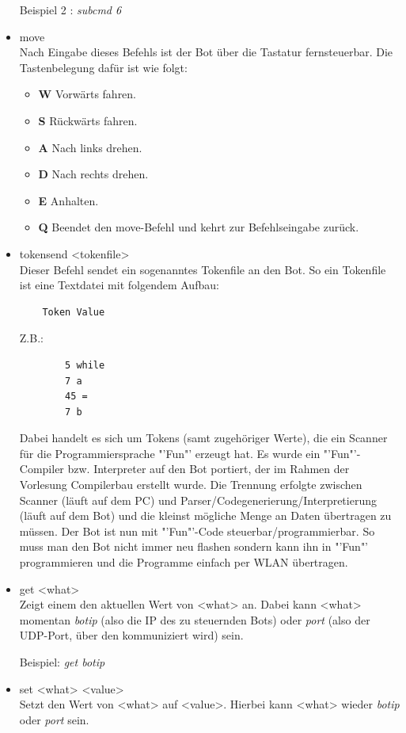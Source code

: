 \begin{itemize}
    Beispiel 2 : \textit{subcmd 6}
    \item move\\
    Nach Eingabe dieses Befehls ist der Bot über die Tastatur fernsteuerbar. Die Tastenbelegung dafür ist wie folgt:
    \begin{itemize}
        \item \textbf{W} Vorwärts fahren.
        \item \textbf{S} Rückwärts fahren.
        \item \textbf{A} Nach links drehen.
        \item \textbf{D} Nach rechts drehen.
        \item \textbf{E} Anhalten.
        \item \textbf{Q} Beendet den move-Befehl und kehrt zur Befehlseingabe zurück.
    \end{itemize}
    \item tokensend <tokenfile>\\
    Dieser Befehl sendet ein sogenanntes Tokenfile an den Bot. So ein Tokenfile ist eine Textdatei mit folgendem Aufbau:
    \begin{verbatim}
    Token Value
    \end{verbatim}
    Z.B.:
    \begin{verbatim}
        5 while
        7 a
        45 =
        7 b
    \end{verbatim}
    Dabei handelt es sich um Tokens (samt zugehöriger Werte), die ein Scanner für die Programmiersprache "'Fun"' erzeugt hat. Es wurde ein "'Fun"'-Compiler bzw. Interpreter auf den Bot portiert, der im Rahmen der Vorlesung Compilerbau erstellt wurde. Die Trennung erfolgte zwischen Scanner (läuft auf dem PC) und Parser/Codegenerierung/Interpretierung (läuft auf dem Bot) und die kleinst mögliche Menge an Daten übertragen zu müssen. Der Bot ist nun mit "'Fun"'-Code steuerbar/programmierbar. So muss man den Bot nicht immer neu flashen sondern kann ihn in "'Fun"' programmieren und die Programme einfach per WLAN übertragen.
    \item get <what>\\
    Zeigt einem den aktuellen Wert von <what> an. Dabei kann <what> momentan \textit{botip} (also die IP des zu steuernden Bots) oder \textit{port} (also der UDP-Port, über den kommuniziert wird) sein.
    
    Beispiel: \textit{get botip}
    \item set <what> <value>\\
    Setzt den Wert von <what> auf <value>. Hierbei kann <what> wieder \textit{botip} oder \textit{port} sein.
    

\end{itemize}
